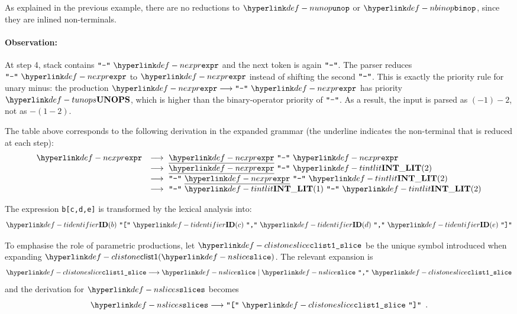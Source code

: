 As explained in the previous example, there are no reductions to $\Nunop$ or $\Nbinop$,
since they are inlined non-terminals.

\paragraph{Observation:}
At step 4, stack contains $\Tminus \parsesep \Nexpr$ and the next token is again $\texttt{"}\texttt{-}\texttt{"}$.
The parser reduces $\Tminus \parsesep \Nexpr$ to $\Nexpr$ instead of shifting the second $\texttt{"}\texttt{-}\texttt{"}$.
This is exactly the priority rule for unary minus:
the production $\Nexpr \derives \Tminus \parsesep \Nexpr$ has priority $\Tunops$,
which is higher than the binary-operator priority of $\texttt{"}\texttt{-}\texttt{"}$.
As a result, the input is parsed as $(-1) - 2$, not as $-(1 - 2)$.

The table above corresponds to the following derivation in the expanded grammar
(the underline indicates the non-terminal that is reduced at each step):
\[
\begin{array}{rl}
\Nexpr & \derives\ \underline{\Nexpr} \parsesep \Tminus \parsesep \Nexpr\\
       & \derives\ \underline{\Nexpr} \parsesep \Tminus \parsesep \Tintlit(2)\\
       & \derives\ \Tminus \parsesep \underline{\Nexpr} \parsesep \Tminus \parsesep \Tintlit(2)\\
       & \derives\ \Tminus \parsesep \Tintlit(1) \parsesep \Tminus \parsesep \Tintlit(2)\\
\end{array}
\]

The expression \texttt{b[c,d,e]}
is transformed by the lexical analysis into:
\[
\Tidentifier(b) \parsesep \Tlbracket \parsesep \Tidentifier(c) \parsesep \Tcomma \parsesep \Tidentifier(d) \parsesep \Tcomma \parsesep \Tidentifier(e) \parsesep \Trbracket
\]

To emphasise the role of parametric productions, let $\clistoneslice$
be the unique symbol introduced when expanding $\ClistOne{\Nslice}$.
The relevant expansion is
\[
\clistoneslice \derives \Nslice \;|\; \Nslice \parsesep \Tcomma \parsesep \clistoneslice
\]
and the derivation for $\Nslices$ becomes
\[
\Nslices \derives \Tlbracket \parsesep \clistoneslice \parsesep \Trbracket \enspace.
\]
